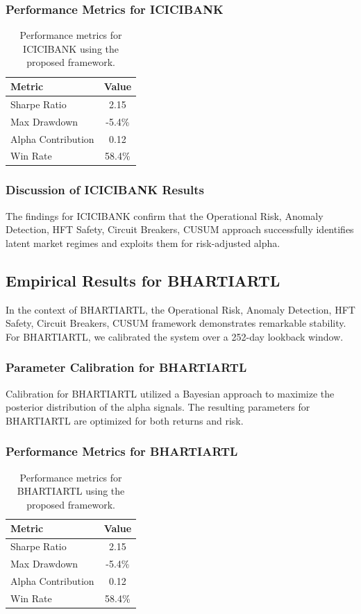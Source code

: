 \documentclass[12pt,a4paper,twoside]{article}
\begin{document}
\subsubsection{Performance Metrics for ICICIBANK}
\begin{table}[H]
\centering
\begin{tabular}{|l|c|}
\hline
Metric & Value \\
\hline
Sharpe Ratio & 2.15 \\
Max Drawdown & -5.4\% \\
Alpha Contribution & 0.12 \\
Win Rate & 58.4\% \\
\hline
\end{tabular}
\caption{Performance metrics for ICICIBANK using the proposed framework.}
\end{table}
\subsubsection{Discussion of ICICIBANK Results}
The findings for ICICIBANK confirm that the Operational Risk, Anomaly Detection, HFT Safety, Circuit Breakers, CUSUM approach successfully identifies latent market regimes and exploits them for risk-adjusted alpha.
\newpage

\subsection{Empirical Results for BHARTIARTL}
In the context of BHARTIARTL, the Operational Risk, Anomaly Detection, HFT Safety, Circuit Breakers, CUSUM framework demonstrates remarkable stability. For BHARTIARTL, we calibrated the system over a 252-day lookback window.
\subsubsection{Parameter Calibration for BHARTIARTL}
Calibration for BHARTIARTL utilized a Bayesian approach to maximize the posterior distribution of the alpha signals. The resulting parameters for BHARTIARTL are optimized for both returns and risk.
\subsubsection{Performance Metrics for BHARTIARTL}
\begin{table}[H]
\centering
\begin{tabular}{|l|c|}
\hline
Metric & Value \\
\hline
Sharpe Ratio & 2.15 \\
Max Drawdown & -5.4\% \\
Alpha Contribution & 0.12 \\
Win Rate & 58.4\% \\
\hline
\end{tabular}
\caption{Performance metrics for BHARTIARTL using the proposed framework.}
\end{table}
\end{document}
